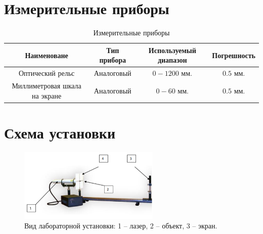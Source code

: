 \documentclass{article}
\begin{document}
\section{Измерительные приборы}
\begin{table}[h]
    \centering
    \bgroup
    \def\arraystretch{1.2}
    \begin{tabular}{|c|c|c|c|}
        \hline
        Наименоване & Тип прибора & Используемый диапазон & Погрешность \\
        \hline
        Оптический рельс & Аналоговый & $0-1200$ мм. & $0.5$ мм. \\
        \hline
        Миллиметровая шкала на экране & Аналоговый & $0-60$ мм. & $0.5$ мм. \\
        \hline
    \end{tabular}
    \egroup
    \caption{Измерительные приборы} 
\end{table}
\section{Схема установки}
\begin{figure}[h!]
    \begin{center}
    \includegraphics[width=0.6\textwidth]{scheme.png}
    \caption{Вид лабораторной установки: 1 – лазер, 2 – объект, 3 – экран.}
    \label{fig:scheme}    
    \end{center}
\end{figure}
\end{document}
